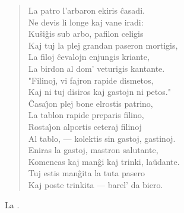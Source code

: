 \begin{verse}
               \vin   La patro l'arbaron ekiris \^casadi.\\
               Ne devis li longe kaj vane iradi:\\
               Ku\^si\^gis sub arbo, pafilon celigis\\
               Kaj tuj la plej grandan paseron mortigis,\\
               La filoj \^cevalojn enjungis kriante,\\
               La birdon al dom' veturigis kantante.\\
               "Filinoj, vi fajron rapide dismetos,\\
               Kaj ni tuj disiros kaj gastojn ni petos."\\
               \^Casa\^{\j}on plej bone elrostis patrino,\\
               La tablon rapide preparis filino,\\
               Rosta\^{\j}on alportis ceteraj filinoj\\
               Al tablo, --- kolektis sin gastoj, gastinoj.\\
               Eniras la gastoj, mastron salutante,\\
               Komencas kaj man\^gi kaj trinki, la\u udante.\\
               Tuj estis man\^gita la tuta pasero\\
               Kaj poste trinkita --- barel' da biero.

\end{verse}
\begin{flushright}
\footnotesize La .
\end{flushright}

\smallrule{}